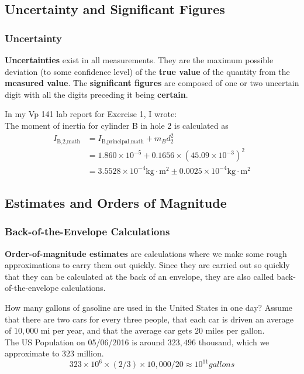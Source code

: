 \subsection{Uncertainty and Significant Figures}
\begin{frame}
\frametitle{Uncertainty}
\begin{definition}
\textbf{\alert{Uncertainties}} exist in all measurements. They are the maximum possible deviation (to some confidence level) of the \textbf{true value} of the quantity from the \textbf{measured value}. The \alert{\textbf{significant figures}} are composed of \alert{one or two uncertain digit} with all the digits preceding it being \alert{\textbf{certain}}.
\end{definition}
\begin{example}
In my Vp 141 lab report for Exercise 1, I wrote:\\
The moment of inertia for cylinder B in hole 2 is calculated as
\begin{align*}I_{\text{B,2,math}}&=I_{\text{B,principal,math}}+m_{B}d_{2}^{2}\\&=1.860\times 10^{-5}+0.1656\times (45.09\times 10^{-3})^{2}\\&=3.5528\times 10^{-4}\mathrm{kg\cdot m^{2}}\pm 0.0025 \times 10^{-4}\mathrm{kg\cdot m^{2}}\end{align*}
\end{example}
\end{frame}
\subsection{Estimates and Orders of Magnitude}
\begin{frame}
\frametitle{Back-of-the-Envelope Calculations}
\begin{definition}
\textbf{\alert{Order-of-magnitude estimates}} are calculations where we make some \alert{rough approximations} to carry them out quickly. Since they are carried out so quickly that they can be calculated at the back of an envelope, they are also called \alert{back-of-the-envelope calculations}.
\end{definition}
\begin{example}
How many gallons of gasoline are used in the United States in one day? Assume that there are two cars for every three people, that each car is driven an average of $10,000$ mi per year, and that the average car gets $20$ miles per gallon.\\
The US Population on 05/06/2016 is around $323,496$ thousand, which we \alert{approximate} to $323$ million. \[323\times 10^6\times (2/3)\times 10,000/20\approx 10^{11}\unit{gallons}\]
\end{example}
\end{frame}
